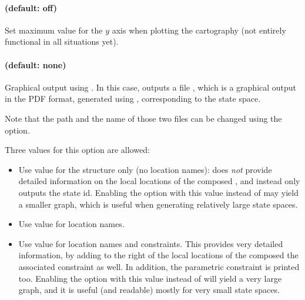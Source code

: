 \paragraph{ (default: off)}
Set maximum value for the $y$ axis when plotting the cartography (not entirely functional in all situations yet).



\paragraph{ (default: none)}
Graphical output using \gdot{}.
In this case, \imitator{} outputs a file , which is a graphical output in the PDF format, generated using \gdot{}, corresponding to the state space.

Note that the path and the name of those two files can be changed using the  option.

Three values for this option are allowed:
\begin{itemize}
	\item Use value  for the structure only (no location names): does \emph{not} provide detailed information on the local locations of the composed \IPTA{}, and instead only outputs the state id.
	      Enabling the option with this value instead of  may yield a smaller graph, which is useful when generating relatively large state spaces.

	\item Use value  for location names.

	\item Use value  for location names and constraints.
	      This provides very detailed information, by adding to the right of the local locations of the composed \IPTA{} the associated constraint as well.
	      In addition, the parametric constraint is printed too.
	      Enabling the option with this value instead of  will yield a very large graph, and it is useful (and readable) mostly for very small state spaces.

\end{itemize}





